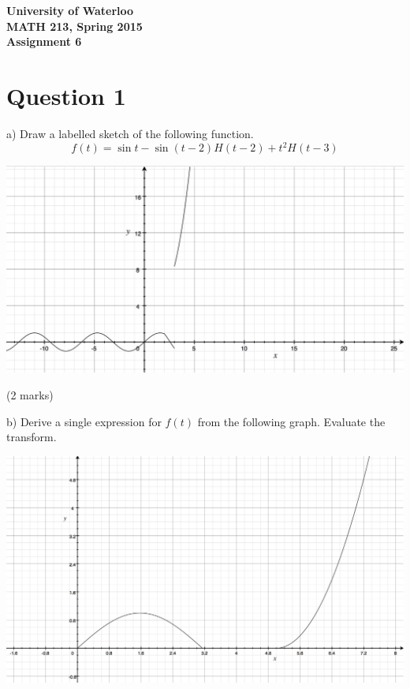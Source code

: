 \documentclass[12pt]{article}
\begin{document}
\begin{center}
{\Large\bf University of Waterloo}\\
\vspace{3mm}
{\Large\bf MATH 213, Spring 2015}\\
\vspace{2mm}
{\Large\bf Assignment 6}\\
\end{center}

\section*{Question 1}
a) Draw a labelled sketch of the following function. $$f(t) = \sin t - \sin (t-2) H(t-2) + t^2H(t-3)$$

\begin{center}
  \includegraphics[scale=0.4]{q1agraph.png}
\end{center}
\hfill (2 marks)

\noindent b) Derive a single expression for $f(t)$ from the following graph. Evaluate the transform.
\begin{center}
  \includegraphics[scale=0.2]{q1graph.png}
\end{center}
\end{document}
